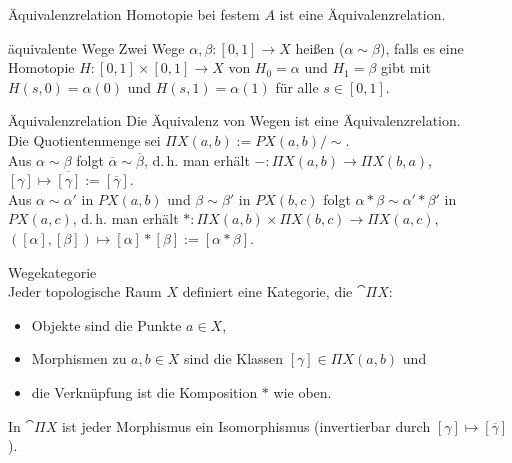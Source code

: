 \begin{Lemma}{Äquivalenzrelation}
    Homotopie bei festem $A$ ist eine Äquivalenzrelation.
\end{Lemma}

\linie

\begin{Def}{äquivalente Wege}
    Zwei Wege $\alpha, \beta\colon [0, 1] \rightarrow X$ heißen
     ($\alpha \sim \beta$), falls es eine Homotopie
    $H\colon [0, 1] \times [0, 1] \rightarrow X$ von $H_0 = \alpha$ und
    $H_1 = \beta$ gibt mit $H(s, 0) = \alpha(0)$ und $H(s, 1) = \alpha(1)$
    für alle $s \in [0, 1]$.
\end{Def}

\begin{Lemma}{Äquivalenzrelation}
    Die Äquivalenz von Wegen ist eine Äquivalenzrelation. \\
    Die Quotientenmenge sei $\Pi X(a, b) := PX(a, b) / \sim$. \\
    Aus $\alpha \sim \beta$ folgt $\overline{\alpha} \sim \overline{\beta}$,
    d.\,h. man erhält $-\colon \Pi X(a, b) \rightarrow \Pi X(b, a)$,
    $[\gamma] \mapsto \overline{[\gamma]} := [\overline{\gamma}]$. \\
    Aus $\alpha \sim \alpha'$ in $PX(a, b)$ und $\beta \sim \beta'$ in
    $PX(b, c)$ folgt $\alpha \ast \beta \sim \alpha' \ast \beta'$ in
    $PX(a, c)$, d.\,h. man erhält
    $\ast\colon \Pi X(a, b) \times \Pi X(b, c) \rightarrow \Pi X(a, c)$,
    $([\alpha], [\beta]) \mapsto [\alpha] \ast [\beta] := [\alpha \ast \beta]$.
\end{Lemma}

\linie

\begin{Def}{Wegekategorie}\\
    Jeder topologische Raum $X$ definiert eine Kategorie,
    die  $\cat{\Pi X}$:
    \begin{itemize}
        \item
        Objekte sind die Punkte $a \in X$,

        \item
        Morphismen zu $a, b \in X$ sind die Klassen $[\gamma] \in \Pi X(a, b)$
        und

        \item
        die Verknüpfung ist die Komposition $\ast$ wie oben.
    \end{itemize}
    In $\cat{\Pi X}$ ist jeder Morphismus ein Isomorphismus
    (invertierbar durch $[\gamma] \mapsto [\overline{\gamma}]$).
\end{Def}

